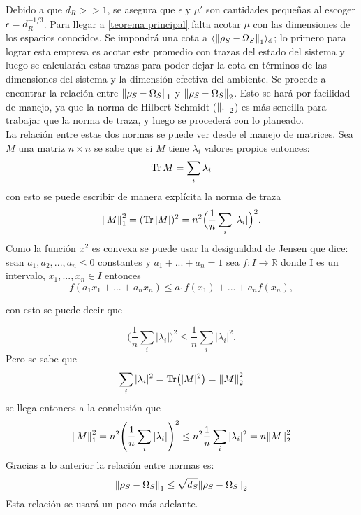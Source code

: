 Debido a que $d_{R}>>1$, se asegura que $\epsilon$ y $\mu'$ son cantidades pequeñas al escoger $\epsilon=d_{R}^{-1/3}$. Para llegar a \ref{teorema principal} falta acotar $\mu$ con las dimensiones de los espacios conocidos. Se impondrá una cota a $\langle \norm{\rho_{S} -\Omega_{S}}_{1} \rangle_{\phi}$; lo primero  para lograr esta empresa es acotar este promedio con trazas del estado del sistema  y luego se calcularán estas trazas para poder dejar la cota en términos de las dimensiones del sistema y la dimensión efectiva del ambiente. Se procede a encontrar la relación entre $\norm{\rho_{S} -\Omega_{S}}_{1}$ y $\norm{\rho_{S} -\Omega_{S}}_{2}$. Esto se hará por facilidad de manejo, ya que la norma de Hilbert-Schmidt ($\norm{.}_{2}$) es más sencilla para trabajar que la norma de traza, y luego se procederá con lo planeado.
\\
La relación entre estas dos normas se puede ver desde el manejo de matrices. Sea $M$ una matriz $n \times n$ se sabe que si $M$ tiene $\lambda_{i}$ valores propios entonces:
\begin{equation}
\Tr M= \sum_{i} \lambda_{i}
\end{equation}
con esto se puede escribir de manera explícita la norma de traza 
\begin{equation}
\norm{M}_{1}^2=(\Tr|M|)^{2}=n^{2} \Big( \frac{1}{n}\sum_{i} |\lambda_{i}| \Big)^{2}.
\end{equation}
Como la función $x^{2}$ es convexa se puede usar la desigualdad de Jensen que dice: sean $a_{1},a_{2},...,a_{n} \le 0$ constantes y $a_{1} +...+a_{n}=1$ sea $f: I \to \mathbb{R}$ donde I es un intervalo, $x_{1},...,x_{n} \in I$ entonces
\begin{equation}
f(a_{1}x_{1}+...+a_{n}x_{n}) \le a_{1}f(x_{1})+...+a_{n}f(x_{n}),
\end{equation}

con esto se puede decir que

\begin{equation}
\Big( \frac{1}{n}\sum_{i} |\lambda_{i}| \Big)^{2} \le \frac{1}{n}\sum_{i} |\lambda_{i}|^{2}.
\end{equation}
Pero se sabe que 
\begin{equation}
\sum_{i} |\lambda_{i}|^2= \Tr(|M|^2)=\norm{M}_{2}^{2}
\end{equation}
se llega entonces a la conclusión que 
\begin{equation}
\norm{M}_{1}^{2} = n^{2}\Bigg( \frac{1}{n} \sum_{i}| \lambda_{i} | \Bigg)^{2} \le  n^{2} \frac{1}{n} \sum_{i} | \lambda_{i} |^{2}= n\norm{M}_{2}^{2}
\end{equation}
Gracias a lo anterior la relación entre normas es:
\begin{equation}\label{eq:0}
\norm{\rho_{S} - \Omega_{S}}_{1} \le \sqrt{d_{S}}\norm{\rho_{S} - \Omega_{S}}_{2}
\end{equation}
Esta relación se usará un poco más adelante.\\

